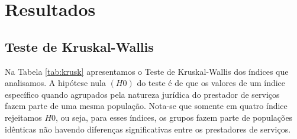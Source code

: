  

\section{Resultados}\label{s:resul}

\begin{multicols}{2}

\subsection{Teste de Kruskal-Wallis}

Na Tabela \ref{tab:krusk} apresentamos o Teste de Kruskal-Wallis dos índices que analisamos. A hipótese nula $(H0)$ do teste é de que os valores de um índice específico quando agrupados pela natureza jurídica do prestador de serviços fazem parte de uma mesma população. Nota-se que somente em quatro índice rejeitamos $H0$, ou seja, para esses índices, os grupos fazem parte de populações idênticas não havendo diferenças significativas entre os prestadores de serviços.

\end{multicols}







